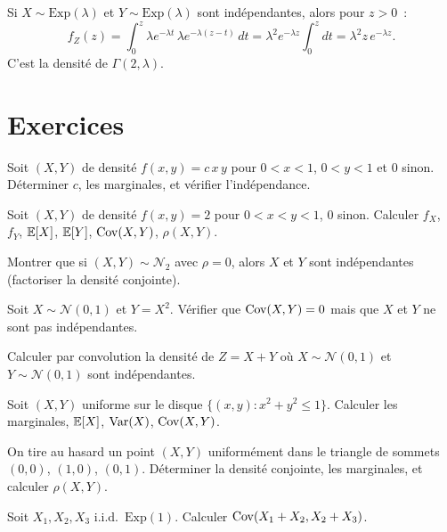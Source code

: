 \begin{exemple}
Si $X \sim \text{Exp}(\lambda)$ et $Y \sim \text{Exp}(\lambda)$ sont ind\'ependantes,
alors pour $z > 0$~:
\[
    f_Z(z) = \int_0^z \lambda e^{-\lambda t}\, \lambda e^{-\lambda(z-t)}\, dt
    = \lambda^2 e^{-\lambda z} \int_0^z dt = \lambda^2 z\, e^{-\lambda z}.
\]
C'est la densit\'e de $\Gamma(2, \lambda)$.
\end{exemple}

\section{Exercices}

\begin{exercice}
Soit $(X,Y)$ de densit\'e $f(x,y) = c\, x\, y$ pour $0 < x < 1$, $0 < y < 1$
et 0 sinon. D\'eterminer $c$, les marginales, et v\'erifier l'ind\'ependance.
\end{exercice}

\begin{exercice}
Soit $(X,Y)$ de densit\'e $f(x,y) = 2$ pour $0 < x < y < 1$, $0$ sinon.
Calculer $f_X$, $f_Y$, $\mathbb{E}[X]$, $\mathbb{E}[Y]$, $\mathrm{Cov}(X,Y)$, $\rho(X,Y)$.
\end{exercice}

\begin{exercice}
Montrer que si $(X,Y) \sim \mathcal{N}_2$ avec $\rho = 0$, alors $X$ et $Y$
sont ind\'ependantes (factoriser la densit\'e conjointe).
\end{exercice}

\begin{exercice}
Soit $X \sim \mathcal{N}(0,1)$ et $Y = X^2$. V\'erifier que $\mathrm{Cov}(X,Y) = 0$
mais que $X$ et $Y$ ne sont pas ind\'ependantes.
\end{exercice}

\begin{exercice}
Calculer par convolution la densit\'e de $Z = X + Y$ o\`u
$X \sim \mathcal{N}(0,1)$ et $Y \sim \mathcal{N}(0,1)$ sont ind\'ependantes.
\end{exercice}

\begin{exercice}
Soit $(X,Y)$ uniforme sur le disque $\{(x,y) : x^2 + y^2 \leq 1\}$.
Calculer les marginales, $\mathbb{E}[X]$, $\mathrm{Var}(X)$, $\mathrm{Cov}(X,Y)$.
\end{exercice}

\begin{exercice}
On tire au hasard un point $(X,Y)$ uniform\'ement dans le triangle de sommets
$(0,0)$, $(1,0)$, $(0,1)$. D\'eterminer la densit\'e conjointe, les marginales,
et calculer $\rho(X,Y)$.
\end{exercice}

\begin{exercice}
Soit $X_1, X_2, X_3$ i.i.d.\ $\text{Exp}(1)$. Calculer $\mathrm{Cov}(X_1 + X_2, X_2 + X_3)$.
\end{exercice}
